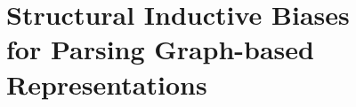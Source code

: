 \chapter[Structural Inductive Biases for Parsing Graph-based \\Representations]{
Structural Inductive Biases \\for Parsing Graph-based \\Representations
}
\label{chap:lexical-phrasal}











% 




